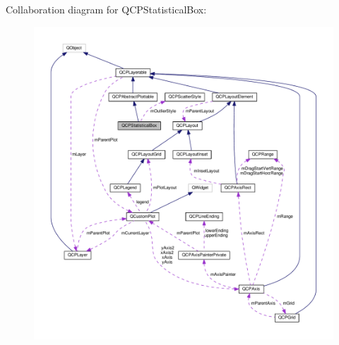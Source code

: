 Collaboration diagram for Q\+C\+P\+Statistical\+Box\+:
\nopagebreak
\begin{figure}[H]
\begin{center}
\leavevmode
\includegraphics[width=350pt]{classQCPStatisticalBox__coll__graph}
\end{center}
\end{figure}
